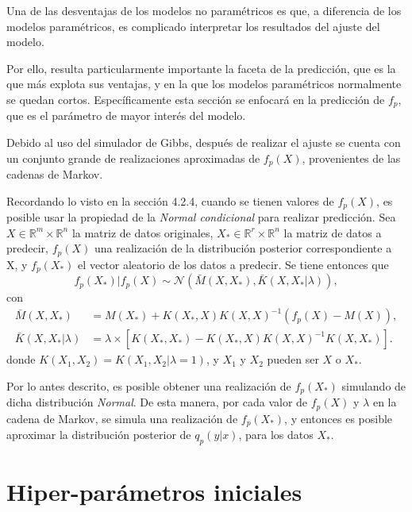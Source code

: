 Una de las desventajas de los modelos no param\'etricos es que, a diferencia de los modelos param\'etricos, es complicado interpretar los resultados del ajuste del modelo.

Por ello, resulta particularmente importante la faceta de la predicci\'on, que es la que m\'as explota sus ventajas, y en la que los modelos param\'etricos normalmente se quedan cortos. Espec\'ificamente esta secci\'on se enfocar\'a en la predicci\'on de $f_p$, que es el par\'ametro de mayor inter\'es del modelo.

Debido al uso del simulador de Gibbs, despu\'es de realizar el ajuste se cuenta con un conjunto grande de realizaciones aproximadas de $f_p(X)$, provenientes de las cadenas de Markov.

Recordando lo visto en la secci\'on 4.2.4, cuando se tienen valores de $f_p(X)$, es posible usar la propiedad de la \textit{Normal condicional} para realizar predicci\'on. Sea $X \in \mathbb{R}^m \times \mathbb{R}^n$ la matriz de datos originales, $X_* \in \mathbb{R}^r \times \mathbb{R}^n$ la matriz de datos a predecir, $f_p(X)$ una realizaci\'on de la distribuci\'on posterior correspondiente a X, y $f_p(X_*)$ el vector aleatorio de los datos a predecir. Se tiene entonces que 
\begin{equation*}
    f_p(X_*)|f_p(X) 
    \sim \mathcal{N}
    (\bar{M}(X,X_*),\bar{K}(X,X_*|\lambda)),
\end{equation*}
con
\begin{equation*}
\begin{aligned}
    \bar{M}(X,X_*) &= M(X_*) + K(X_*,X)K(X,X)^{-1}(f_p(X) - M(X)), \\
    \bar{K}(X,X_*|\lambda) &= 
    \lambda
    \times
    \left[
    K(X_*,X_*) -
    K(X_*,X)K(X,X)^{-1}K(X,X_*)
    \right]
    .
\end{aligned}
\end{equation*}
donde $K(X_1,X_2) = K(X_1,X_2|\lambda=1)$, y $X_1$ y $X_2$ pueden ser $X$ o $X_*$.

Por lo antes descrito, es posible obtener una realizaci\'on de $f_p(X_*)$ simulando de dicha distribuci\'on \textit{Normal}. De esta manera, por cada valor de $f_p(X)$ y $\lambda$ en la cadena de Markov, se simula una realizaci\'on de $f_p(X_*)$, y entonces es posible aproximar la distribuci\'on posterior de $q_p(y|x)$, para los datos $X_*$.

\section{Hiper-par\'ametros iniciales}

